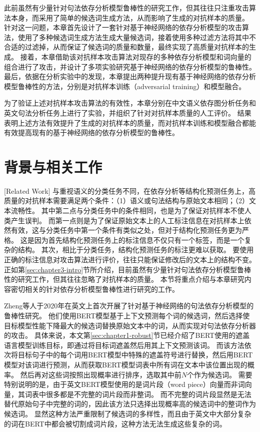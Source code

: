 此前虽然有少量针对句法依存分析模型鲁棒性的研究工作，但其往往只注重攻击算法本身，而采用了简单的候选词生成方法，从而影响了生成的对抗样本的质量。
针对这一问题，本章首先设计了一套针对基于神经网络的依存分析模型的攻击算法，使用了多种候选词生成方法生成大量候选词，接着使用多种过滤方法将其中不合适的过滤掉，从而保证了候选词的质量和数量，最终实现了高质量对抗样本的生成。
接着，本章借助该对抗样本攻击算法对现存的多种依存分析模型和词向量的组合进行了攻击，并设计了多项实验研究基于神经网络的依存分析模型的鲁棒性。
最后，依据在分析实验中的发现，本章提出两种提升现有基于神经网络的依存分析模型鲁棒性的方法，分别是对抗样本训练（adversarial training）和模型融合。

为了验证上述对抗样本攻击算法的有效性，本章分别在中文语义依存图分析任务和英文句法分析任务上进行了实验，并组织了针对对抗样本质量的人工评价。
结果表明上述方法有效提升了生成的对抗样本的质量，而对抗样本训练和模型融合都能有效提高现有的基于神经网络的依存分析模型的鲁棒性。

\section{背景与相关工作}[Related Work]
\label{sec:chapter3-related-work}
与重视语义的分类任务不同，在依存分析等结构化预测任务上，高质量的对抗样本需要满足两个条件：（1）语义或句法结构与原始文本相同；（2）文本流畅性。
其中第二点与分类任务中的条件相同，也是为了保证对抗样本不使人类产生误判。
而第一点则是为了保证原始文本上的人工标注信息在对抗样本上依然有效，这与分类任务中第一个条件有类似之处，但对于结构化预测任务更为严格。
这是因为首先结构化预测任务上的标注信息不仅只有一个标签，而是一个复杂的结构。
其次，相比于分类任务，结构化预测任务的标注更难以获取。
要使用正确的标注信息对攻击算法进行评价，往往只能保证修改后的文本上的结构不变。
正如第\ref{sec:chapter3-intro}节所介绍，目前虽然有少量针对句法依存分析模型鲁棒性的研究工作，但其往往忽略了对抗样本的质量。
本节将重点介绍与本章研究内容密切相关的针对依存分析模型鲁棒性进行研究的工作。

Zheng等人\cite{zheng-etal-2020-evaluating}于2020年在英文上首次开展了针对基于神经网络的句法依存分析模型的鲁棒性研究。
他们使用BERT模型基于上下文预测每个词的候选词，然后选择使目标模型性能下降最大的候选词替换原始文本中的词，从而实现对句法依存分析器的攻击。
具体来说，本文第\ref{sec:chapter1-robust}节已经介绍了BERT使用的遮盖语言模型训练目标，即通过将目标词遮盖然后用其上下文预测该词。
而该方法依次将目标句子中的每个词用BERT模型中特殊的遮盖符号进行替换，然后用BERT模型对该词进行预测，从而获取BERT模型词表中所有词在文本中该位置出现的概率。
然后再对这些词按照出现概率进行排序，选取其中前$N$个作为候选词。
需要特别说明的是，由于英文BERT模型使用的是词片段（word piece）向量而非词向量，其词表中很多都是不完整的词片段而非整词。
而不完整的词片段显然是无法替代原始句子中完整的词的，因此该方法只选择出现概率高的候选词中的整词作为候选词。
显然这种方法严重限制了候选词的多样性，而且由于英文中大部分复杂的词在BERT中都会被切割成词片段，这种方法无法生成这些复杂的词。

